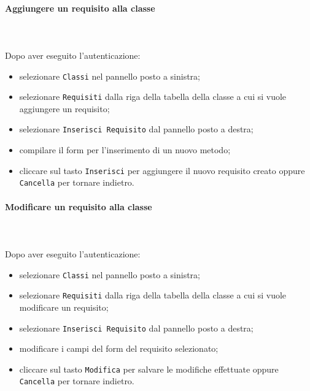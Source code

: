 	\paragraph{Aggiungere un requisito alla classe} \mbox{}\\ \mbox{}\\
	Dopo aver eseguito l'autenticazione:
	\begin{itemize}
		\item selezionare \texttt{Classi} nel pannello posto a sinistra;
		\item selezionare \texttt{Requisiti} dalla riga della tabella della classe
		a cui si vuole aggiungere un requisito;
		\item selezionare \texttt{Inserisci Requisito} dal pannello posto a destra;
		\item compilare il form per l'inserimento di un nuovo metodo;
		\item cliccare sul tasto \texttt{Inserisci} per aggiungere il nuovo requisito 
		creato oppure \texttt{Cancella} per tornare indietro.	
	\end{itemize}
	
	\paragraph{Modificare un requisito alla classe} \mbox{}\\ \mbox{}\\
	Dopo aver eseguito l'autenticazione:
	\begin{itemize}
		\item selezionare \texttt{Classi} nel pannello posto a sinistra;
		\item selezionare \texttt{Requisiti} dalla riga della tabella della classe
		a cui si vuole modificare un requisito;
		\item selezionare \texttt{Inserisci Requisito} dal pannello posto a destra;
		\item modificare i campi del form del requisito selezionato;
		\item cliccare sul tasto \texttt{Modifica} per salvare le modifiche effettuate
		oppure \texttt{Cancella} per tornare indietro.
	\end{itemize}
	
